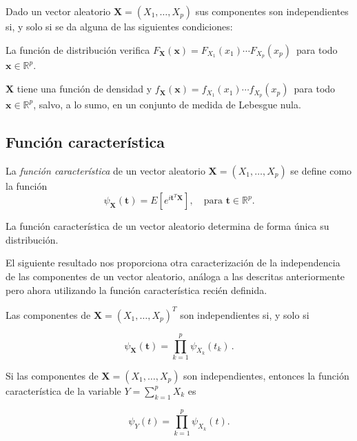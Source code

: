 \begin{nprop}
  Dado un vector aleatorio $\boldsymbol X = (X_1, \dots, X_p)$ sus componentes son independientes si, y solo si se da alguna de las siguientes condiciones:
  \begin{nlist}
  \item La función de distribución verifica $F_{\boldsymbol X} (\boldsymbol x) = F_{X_1} (x_1) \cdots F_{X_p}(x_p)\,$ para todo \(\boldsymbol x \in \mathbb{R}^p\).
   \item $\boldsymbol X$ tiene una función de densidad y \(f_{\boldsymbol X} (\boldsymbol x) = f_{X_1}(x_1) \cdots f_{X_p}(x_p)\,\) para todo \(\boldsymbol x \in \mathbb{R}^p\), salvo, a lo sumo, en un conjunto de medida de Lebesgue nula.
  \end{nlist}
\end{nprop}

\subsection{Función característica}

\begin{ndef} \label{funcioncaracteristica}
    La \emph{función característica} de un vector aleatorio \(\boldsymbol X = (X_1,\dots,X_p)\) se define como la función \[\psi_{\boldsymbol X}(\boldsymbol t)=E\left[e^{i\boldsymbol t^T\boldsymbol X}\right], \quad\text{para } \boldsymbol t\in \mathbb{R}^p.\]
\end{ndef}

\begin{nth}[Unicidad]
  La función característica de un vector aleatorio determina de forma única su distribución.
\end{nth}

El siguiente resultado nos proporciona otra caracterización de la independencia de las componentes de un vector aleatorio, análoga a las descritas anteriormente pero ahora utilizando la función característica recién definida.

\begin{nprop}
  Las componentes de \(\boldsymbol X=(X_1,\dots,X_p)^T\) son independientes si, y solo si

  \[
    \psi_{\boldsymbol X}(\boldsymbol t) = \prod_{k=1}^p\psi_{X_k}(t_k)\,
  .\]
\end{nprop}

\begin{nprop}
  Si las componentes de \(\boldsymbol X=(X_1,\dots, X_p)\) son independientes, entonces la función característica de la variable $Y=\sum_{k=1}^p X_k$ es

  \[
    \psi_{Y}(t) = \prod_{k=1}^p\psi_{X_k}(t)
  .\]
\end{nprop}

